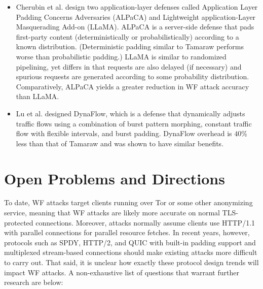 \documentclass[runningheads]{llncs}
\begin{document}
\begin{itemize}
\item Cherubin et al. \cite{cherubin2017website} design two application-layer defenses called Application
Layer Padding Concerns Adversaries (ALPaCA) and Lightweight application-Layer Masquerading Add-on (LLaMA).
ALPaCA is a server-side defense that pads first-party content (deterministically or probabilistically)
according to a known distribution. (Deterministic padding similar to Tamaraw performs worse than
probabilistic padding.) LLaMA is similar to randomized pipelining, yet differs in that requests are also
delayed (if necessary) and spurious requests are generated according to some probability distribution.
Comparatively, ALPaCA yields a greater reduction in WF attack accuracy than LLaMA.

\item Lu et al. \cite{lu2018dynaflow} designed DynaFlow, which is a defense that dynamically adjusts
traffic flows using a combination of burst pattern morphing, constant traffic flow with flexible
intervals, and burst padding. DynaFlow overhead is $40$\% less than that of Tamaraw and was shown
to have similar benefits.

\end{itemize}
%

\section{Open Problems and Directions}
To date, WF attacks target clients running over Tor or some other anonymizing service, meaning that WF
attacks are likely more accurate on normal TLS-protected connections. Moreover, attacks normally assume clients
use HTTP/1.1 with parallel connections for parallel resource fetches. In recent years, however, protocols
such as SPDY, HTTP/2, and QUIC with built-in padding support and multiplexed stream-based connections
should make existing attacks more difficult to carry out. That said, it is unclear how exactly these protocol
design trends will impact WF attacks. A non-exhaustive list of questions that warrant further research
are below:
\end{document}
